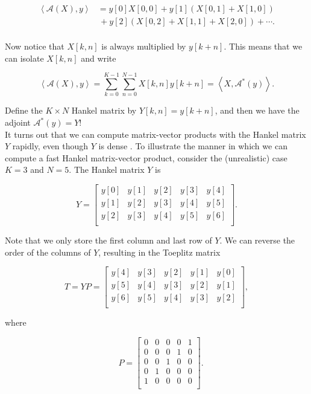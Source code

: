 \documentclass[journal]{IEEEtran}
\begin{document}
\begin{align*}
   \left\langle\mathcal{A}(X),y\right\rangle &= y[0]X[0,0] + y[1]\left(X[0,1]+X[1,0]\right)\\
                                             &\,+ y[2]\left(X[0,2] + X[1,1] + X[2,0]\right) + \cdots.\\
\end{align*}

\noindent Now notice that $X[k,n]$ is always multiplied by $y[k+n]$.  This means that we can isolate $X[k,n]$ and write

\[ \left\langle\mathcal{A}(X),y\right\rangle = \sum_{k=0}^{K-1}\sum_{n=0}^{N-1} X[k,n]y[k+n] = \left\langle X,\mathcal{A}^\ast(y)\right\rangle. \] 

\noindent Define the $K\times N$ Hankel matrix by $Y[k,n] = y[k+n]$, and then we have the adjoint $\mathcal{A}^\ast(y) = Y$!\\

It turns out that we can compute matrix-vector products with the Hankel matrix $Y$ rapidly, even though $Y$ is dense \cite{golub_1996}.  To illustrate the manner in which we can compute a fast Hankel matrix-vector product, consider the (unrealistic) case $K=3$ and $N=5$.  The Hankel matrix $Y$ is

   \[ Y = \begin{bmatrix} y[0] & y[1] & y[2] & y[3] & y[4]\\
                          y[1] & y[2] & y[3] & y[4] & y[5]\\
                          y[2] & y[3] & y[4] & y[5] & y[6]\\\end{bmatrix}. \] 

\noindent Note that we only store the first column and last row of $Y$.  We can reverse the order of the columns of $Y$, resulting in the Toeplitz matrix

\[ T = YP = \begin{bmatrix}
       y[4] & y[3] & y[2] & y[1] & y[0]\\
       y[5] & y[4] & y[3] & y[2] & y[1]\\
       y[6] & y[5] & y[4] & y[3] & y[2]\\\end{bmatrix}, \] 

\noindent where

\[               \quad P = \begin{bmatrix} 0 & 0 & 0 & 0 & 1\\
                                        0 & 0 & 0 & 1 & 0\\
                                        0 & 0 & 1 & 0 & 0\\
                                        0 & 1 & 0 & 0 & 0\\
                                        1 & 0 & 0 & 0 & 0\\ \end{bmatrix}. \] 
\end{document}
